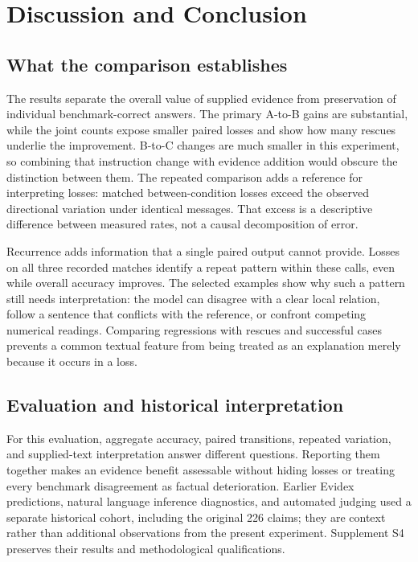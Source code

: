 \documentclass[11pt,letterpaper]{article}
\begin{document}
\section{Discussion and Conclusion}\label{sec:discussion}
\subsection{What the comparison establishes}
The results separate the overall value of supplied evidence from preservation of individual benchmark-correct answers. The primary A-to-B gains are substantial, while the joint counts expose smaller paired losses and show how many rescues underlie the improvement. B-to-C changes are much smaller in this experiment, so combining that instruction change with evidence addition would obscure the distinction between them. The repeated comparison adds a reference for interpreting losses: matched between-condition losses exceed the observed directional variation under identical messages. That excess is a descriptive difference between measured rates, not a causal decomposition of error.

Recurrence adds information that a single paired output cannot provide. Losses on all three recorded matches identify a repeat pattern within these calls, even while overall accuracy improves. The selected examples show why such a pattern still needs interpretation: the model can disagree with a clear local relation, follow a sentence that conflicts with the reference, or confront competing numerical readings. Comparing regressions with rescues and successful cases prevents a common textual feature from being treated as an explanation merely because it occurs in a loss.

\subsection{Evaluation and historical interpretation}
For this evaluation, aggregate accuracy, paired transitions, repeated variation, and supplied-text interpretation answer different questions. Reporting them together makes an evidence benefit assessable without hiding losses or treating every benchmark disagreement as factual deterioration. Earlier Evidex predictions, natural language inference diagnostics, and automated judging used a separate historical cohort, including the original 226 claims; they are context rather than additional observations from the present experiment. Supplement S4 preserves their results and methodological qualifications.
\end{document}
